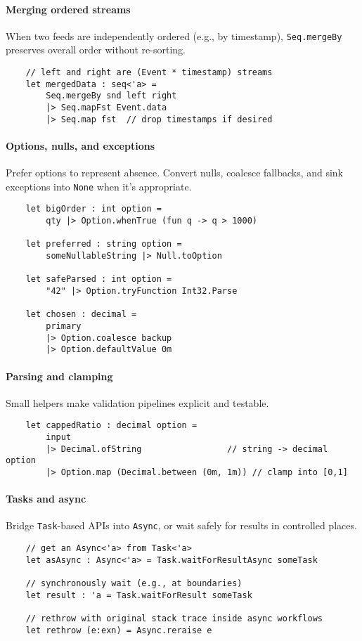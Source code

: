 \documentclass{article}
\begin{document}
\paragraph{Merging ordered streams}
When two feeds are independently ordered (e.g., by timestamp), \texttt{Seq.mergeBy} preserves overall order without re-sorting.
\begin{verbatim}
    // left and right are (Event * timestamp) streams
    let mergedData : seq<'a> =
        Seq.mergeBy snd left right
        |> Seq.mapFst Event.data
        |> Seq.map fst  // drop timestamps if desired
\end{verbatim}

\paragraph{Options, nulls, and exceptions}
Prefer options to represent absence. Convert nulls, coalesce fallbacks, and sink exceptions into \texttt{None} when it’s appropriate.
\begin{verbatim}
    let bigOrder : int option =
        qty |> Option.whenTrue (fun q -> q > 1000)

    let preferred : string option =
        someNullableString |> Null.toOption

    let safeParsed : int option =
        "42" |> Option.tryFunction Int32.Parse

    let chosen : decimal =
        primary
        |> Option.coalesce backup
        |> Option.defaultValue 0m
\end{verbatim}

\paragraph{Parsing and clamping}
Small helpers make validation pipelines explicit and testable.
\begin{verbatim}
    let cappedRatio : decimal option =
        input
        |> Decimal.ofString                 // string -> decimal option
        |> Option.map (Decimal.between (0m, 1m)) // clamp into [0,1]
\end{verbatim}

\paragraph{Tasks and async}
Bridge \texttt{Task}-based APIs into \texttt{Async}, or wait safely for results in controlled places.
\begin{verbatim}
    // get an Async<'a> from Task<'a>
    let asAsync : Async<'a> = Task.waitForResultAsync someTask

    // synchronously wait (e.g., at boundaries)
    let result : 'a = Task.waitForResult someTask

    // rethrow with original stack trace inside async workflows
    let rethrow (e:exn) = Async.reraise e
\end{verbatim}
\end{document}
